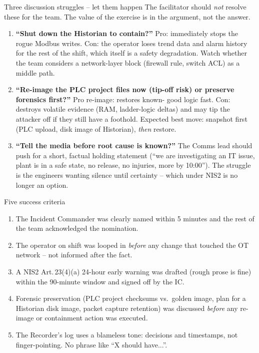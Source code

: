 \documentclass[11pt,a4paper]{article}
\begin{document}
\begin{solutionbox}{Three discussion struggles -- let them happen}
The facilitator should \emph{not} resolve these for the team. The
value of the exercise is in the argument, not the answer.
\begin{enumerate}[leftmargin=*, nosep]
  \item \textbf{``Shut down the Historian to contain?''} Pro:
        immediately stops the rogue Modbus writes. Con: the operator
        loses trend data and alarm history for the rest of the shift,
        which itself is a safety degradation. Watch whether the team
        considers a network-layer block (firewall rule, switch ACL)
        as a middle path.
  \item \textbf{``Re-image the PLC project files now (tip-off risk)
        or preserve forensics first?''} Pro re-image: restores known-
        good logic fast. Con: destroys volatile evidence (RAM,
        ladder-logic deltas) and may tip the attacker off if they
        still have a foothold. Expected best move: snapshot first
        (PLC upload, disk image of Historian), \emph{then} restore.
  \item \textbf{``Tell the media before root cause is known?''} The
        Comms lead should push for a short, factual holding statement
        (``we are investigating an IT issue, plant is in a safe
        state, no release, no injuries, more by 10:00''). The
        struggle is the engineers wanting silence until certainty --
        which under NIS2 is no longer an option.
\end{enumerate}
\end{solutionbox}

\begin{solutionbox}{Five success criteria}
\begin{enumerate}[leftmargin=*, nosep]
  \item The Incident Commander was clearly named within 5 minutes
        and the rest of the team acknowledged the nomination.
  \item The operator on shift was looped in \emph{before} any change
        that touched the OT network -- not informed after the fact.
  \item A NIS2 Art.\,23(4)(a) 24-hour early warning was drafted
        (rough prose is fine) within the 90-minute window and signed
        off by the IC.
  \item Forensic preservation (PLC project checksums vs.\ golden
        image, plan for a Historian disk image, packet capture
        retention) was discussed \emph{before} any re-image or
        containment action was executed.
  \item The Recorder's log uses a blameless tone: decisions and
        timestamps, not finger-pointing. No phrase like ``X should
        have...''.
\end{enumerate}
\end{solutionbox}
\end{document}
